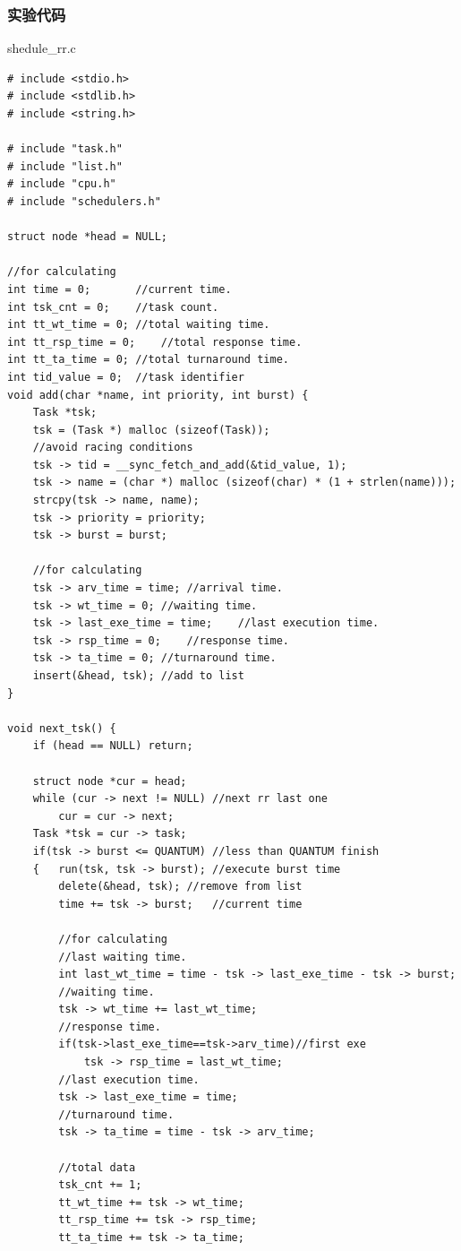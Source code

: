 \documentclass{article}
\begin{document}
\subsubsection{实验代码}
\begin{center}
{\ttfamily shedule\_rr.c}
\end{center}
\begin{lstlisting}[language={[ANSI]C}]
# include <stdio.h>
# include <stdlib.h>
# include <string.h>

# include "task.h"
# include "list.h"
# include "cpu.h"
# include "schedulers.h"

struct node *head = NULL; 

//for calculating
int time = 0;		//current time.
int tsk_cnt = 0;	//task count.
int tt_wt_time = 0;	//total waiting time.
int tt_rsp_time = 0;	//total response time.
int tt_ta_time = 0;	//total turnaround time.
int tid_value = 0;	//task identifier
void add(char *name, int priority, int burst) {
	Task *tsk;
	tsk = (Task *) malloc (sizeof(Task));
	//avoid racing conditions
	tsk -> tid = __sync_fetch_and_add(&tid_value, 1);
	tsk -> name = (char *) malloc (sizeof(char) * (1 + strlen(name)));
	strcpy(tsk -> name, name);
	tsk -> priority = priority;
	tsk -> burst = burst;

	//for calculating
	tsk -> arv_time = time;	//arrival time.
	tsk -> wt_time = 0;	//waiting time.
	tsk -> last_exe_time = time;	//last execution time.
	tsk -> rsp_time = 0;	//response time.
	tsk -> ta_time = 0;	//turnaround time.
	insert(&head, tsk);	//add to list
}

void next_tsk() {
	if (head == NULL) return;
	
	struct node *cur = head;
	while (cur -> next != NULL) //next rr last one
		cur = cur -> next;
	Task *tsk = cur -> task;
	if(tsk -> burst <= QUANTUM)	//less than QUANTUM finish
	{	run(tsk, tsk -> burst);	//execute burst time
		delete(&head, tsk);	//remove from list
		time += tsk -> burst;	//current time

		//for calculating
		//last waiting time.
		int last_wt_time = time - tsk -> last_exe_time - tsk -> burst;
		//waiting time.	
		tsk -> wt_time += last_wt_time;
		//response time.	
		if(tsk->last_exe_time==tsk->arv_time)//first exe
			tsk -> rsp_time = last_wt_time;
		//last execution time.	
		tsk -> last_exe_time = time;
		//turnaround time.
		tsk -> ta_time = time - tsk -> arv_time;
	
		//total data
		tsk_cnt += 1;
		tt_wt_time += tsk -> wt_time;
		tt_rsp_time += tsk -> rsp_time;
		tt_ta_time += tsk -> ta_time;


\end{lstlisting}
\end{document}

